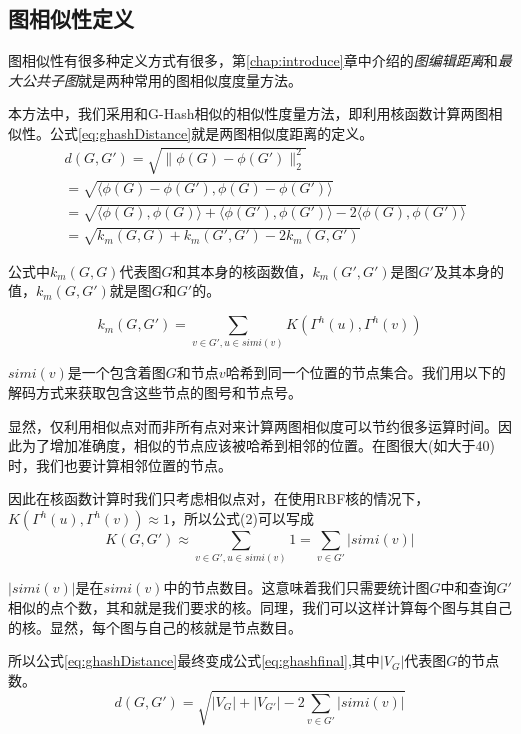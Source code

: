 \documentclass{XDBAthesis}
\begin{document}
\subsection{图相似性定义}
图相似性有很多种定义方式有很多，第\ref{chap:introduce}章中介绍的\emph{图编辑距离}和\emph{最大公共子图}就是两种常用的图相似度度量方法。

本方法中，我们采用和G-Hash相似的相似性度量方法，即利用核函数计算两图相似性。公式\ref{eq:ghashDistance}就是两图相似度距离的定义。
\begin{equation}
\begin{split}
    &d(G,G')=\sqrt{\|\phi(G)-\phi(G')\|_{2}^{2}}\\
              &=\sqrt{\langle\phi(G)-\phi(G'),\phi(G)-\phi(G')\rangle}\\
              &=\sqrt{\langle\phi(G),\phi(G)\rangle+\langle\phi(G'),\phi(G')\rangle-2\langle\phi(G),\phi(G')\rangle}\\
              &=\sqrt{k_{m}(G,G)+k_{m}(G',G')-2k_{m}(G,G')}
\end{split}
\label{eq:ghashDistance}
\end{equation}

公式中$k_{m}(G,G)$代表图$G$和其本身的核函数值，$k_{m}(G',G')$是图$G'$及其本身的值，$k_{m}(G,G')$就是图$G$和$G'$的。

\begin{equation}
k_{m}(G,G')=\sum_{v\in G',u\in simi(v)}K(\Gamma^{h}(u),\Gamma^{h}(v))
\end{equation}

$simi(v)$是一个包含着图$G$和节点$v$哈希到同一个位置的节点集合。我们用以下的解码方式来获取包含这些节点的图号和节点号。

显然，仅利用相似点对而非所有点对来计算两图相似度可以节约很多运算时间。因此为了增加准确度，相似的节点应该被哈希到相邻的位置。在图很大(如大于40)时，我们也要计算相邻位置的节点。

因此在核函数计算时我们只考虑相似点对，在使用RBF核的情况下，$K(\Gamma^{h}(u),\Gamma^{h}(v))\approx1$，所以公式(2)可以写成
\begin{equation}
    K(G,G')\approx\sum_{v\in G',u\in simi(v)}1=\sum_{v\in G'}|simi(v)| 
\end{equation}

$|simi(v)|$是在$simi(v)$中的节点数目。这意味着我们只需要统计图$G$中和查询$G'$相似的点个数，其和就是我们要求的核。同理，我们可以这样计算每个图与其自己的核。显然，每个图与自己的核就是节点数目。

所以公式\ref{eq:ghashDistance}最终变成公式\ref{eq:ghashfinal},其中$|V_{G}|$代表图$G$的节点数。
\begin{equation}
    d(G,G')=\sqrt{|V_{G}|+|V_{G'}| -2\sum_{v\in G'}|simi(v)| }
    \label{eq:ghashfinal}
\end{equation}
\end{document}
